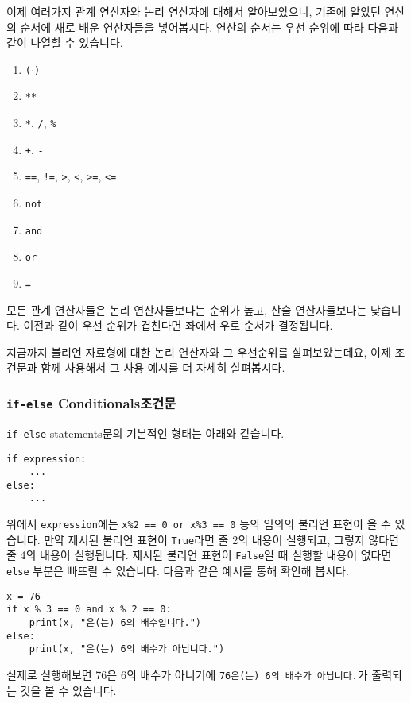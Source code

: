 \documentclass[../main.tex]{subfiles}
\begin{document}
이제 여러가지 관계 연산자와 논리 연산자에 대해서 알아보았으니, 기존에 알았던 연산의 순서에 새로 배운 연산자들을 넣어봅시다.
연산의 순서는 우선 순위에 따라 다음과 같이 나열할 수 있습니다.
\begin{enumerate}
  \item \texttt{($\cdot$)}
  \item \texttt{\texttt{**}}
  \item \texttt{*}, \texttt{/}, \texttt{\%}
  \item \texttt{+}, \texttt{-}
  \item \texttt{==}, \texttt{!=}, \texttt{>}, \texttt{<}, \texttt{>=}, \texttt{<=}
  \item \texttt{not}
  \item \texttt{and}
  \item \texttt{or}
  \item \texttt{=}
\end{enumerate}
모든 관계 연산자들은 논리 연산자들보다는 순위가 높고, 산술 연산자들보다는 낮습니다.
이전과 같이 우선 순위가 겹친다면 좌에서 우로 순서가 결정됩니다.

지금까지 불리언 자료형에 대한 논리 연산자와 그 우선순위를 살펴보았는데요, 이제
조건문과 함께 사용해서 그 사용 예시를 더 자세히 살펴봅시다.

\subsubsection{\texttt{if-else} Conditionals조건문}
\texttt{if-else} statements문의 기본적인 형태는 아래와 같습니다.
\begin{verbatim}
if expression:
    ...
else:
    ...
\end{verbatim}
위에서 \texttt{expression}에는 \texttt{x\%2 == 0 or x\%3 == 0} 등의 임의의
불리언 표현이 올 수 있습니다.  만약 제시된 불리언 표현이 \texttt{True}라면 줄
2의 내용이 실행되고, 그렇지 않다면 줄 4의 내용이 실행됩니다.  제시된 불리언
표현이 \texttt{False}일 때 실행할 내용이 없다면 \texttt{else} 부분은 빠뜨릴 수
있습니다.
다음과 같은 예시를 통해 확인해 봅시다.
\begin{verbatim}
x = 76
if x % 3 == 0 and x % 2 == 0:
    print(x, "은(는) 6의 배수입니다.")
else:
    print(x, "은(는) 6의 배수가 아닙니다.")
\end{verbatim}
실제로 실행해보면 76은 6의 배수가 아니기에 \texttt{76은(는) 6의 배수가
아닙니다.}가 출력되는 것을 볼 수 있습니다.
\end{document}
